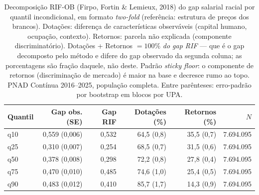 \begin{table}[!ht]
\centering
\caption{Decomposição RIF-OB (Firpo, Fortin \& Lemieux, 2018) do gap salarial racial
por quantil incondicional, em formato \emph{two-fold} (referência: estrutura de preços
dos brancos). Dotações: diferença de características observáveis (capital humano, ocupação,
contexto). Retornos: parcela não explicada (componente discriminatório). Dotações + Retornos
$=100\%$ \emph{do gap RIF} --- que é o gap decomposto pelo
método e difere do gap observado da segunda coluna; as porcentagens
são fração daquele, não deste. Padrão \emph{sticky floor}: o componente de retornos
(discriminação de mercado) é maior na base e decresce rumo ao topo. PNAD Contínua 2016--2025,
população completa. Entre parênteses: erro-padrão por bootstrap em blocos por UPA.}
\label{tab:rif_ob}
\begin{tabular}{lrrrrr}
\toprule
Quantil & Gap obs. (SE) & Gap RIF & Dotações (\%) & Retornos (\%) & $N$ \\
\midrule
q10 & 0,559 (0,006) & 0,532 & 64,5 (0,8) & 35,5 (0,7) & 7.694.095 \\
q25 & 0,310 (0,007) & 0,254 & 68,5 (0,7) & 31,5 (0,6) & 7.694.095 \\
q50 & 0,378 (0,008) & 0,298 & 72,2 (0,8) & 27,8 (0,4) & 7.694.095 \\
q75 & 0,470 (0,010) & 0,485 & 74,6 (1,0) & 25,4 (0,5) & 7.694.095 \\
q90 & 0,483 (0,012) & 0,410 & 85,7 (1,7) & 14,3 (0,9) & 7.694.095 \\
\bottomrule
\end{tabular}
\end{table}
